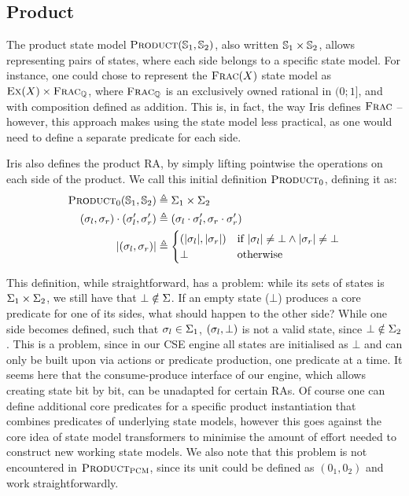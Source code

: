 \subsection{Product}

The product state model $\textsc{Product}(\mathbb S_1, \mathbb S_2)$, also written $\mathbb S_1 \times \mathbb S_2$, allows representing pairs of states, where each side belongs to a specific state model. For instance, one could chose to represent the $\textsc{Frac}(X)$ state model as $\textsc{Ex}(X) \times \textsc{Frac}_{\mathbb{Q}}$, where $\textsc{Frac}_{\mathbb{Q}}$ is an exclusively owned rational in $(0;1]$, and with composition defined as addition. This is, in fact, the way Iris defines $\textsc{Frac}$ \cite{iris-thesis} -- however, this approach makes using the state model less practical, as one would need to define a separate predicate for each side.

Iris also defines the product RA, by simply lifting pointwise the operations on each side of the product. We call this initial definition $\textsc{Product}_0$, defining it as: \begin{align*}
 	\textsc{Product}_0(\mathbb S_1,\mathbb S_2)&\triangleq \Sigma_1 \times \Sigma_2\\
 	(\sigma_l,\sigma_r)\cdot(\sigma_l',\sigma_r') &\triangleq (\sigma_l\cdot \sigma_l',\sigma_r\cdot \sigma_r')\\
 	|(\sigma_l,\sigma_r)|&\triangleq \begin{cases}
(|\sigma_l|, |\sigma_r|) &\text{if}~|\sigma_l|\neq\bot \land |\sigma_r|\neq\bot\\
\bot&\text{otherwise}
\end{cases}
\end{align*}

This definition, while straightforward, has a problem: while its sets of states is $\Sigma_1\times\Sigma_2$, we still have that $\bot\notin\Sigma$. If an empty state ($\bot$) produces a core predicate for one of its sides, what should happen to the other side? While one side becomes defined, such that $\sigma_l\in\Sigma_1$, $(\sigma_l, \bot)$ is not a valid state, since $\bot \notin \Sigma_2$. This is a problem, since in our CSE engine all states are initialised as $\bot$ and can only be built upon via actions or predicate production, one predicate at a time. It seems here that the consume-produce interface of our engine, which allows creating state bit by bit, can be unadapted for certain RAs. Of course one can define additional core predicates for a specific product instantiation that combines predicates of underlying state models, however this goes against the core idea of state model transformers to minimise the amount of effort needed to construct new working state models. We also note that this problem is not encountered in $\textsc{Product}_{\textsc{PCM}}$, since its unit could be defined as $(0_1, 0_2)$ and work straightforwardly.

